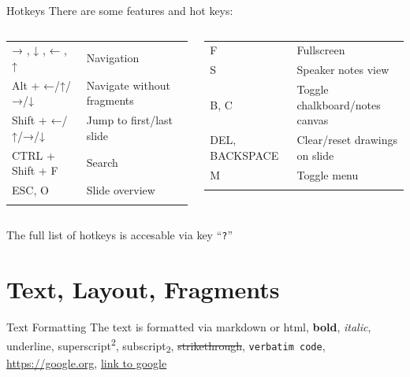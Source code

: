 \documentclass[
  ignorenonframetext,
  aspectratio=169,
]{beamer}
\theoremstyle{plain}
\theoremstyle{remark}
\begin{document}
\begin{frame}[fragile]{Hotkeys}
\label{hotkeys}
There are some features and hot keys:

\begin{columns}[T]
\begin{column}{0.5\textwidth}
\begin{longtable}[]{@{}ll@{}}
\toprule\noalign{}
\endhead
→ , ↓ , ← , ↑ & Navigation \\
Alt + ←/↑/→/↓ & Navigate without fragments \\
Shift + ←/↑/→/↓ & Jump to first/last slide \\
CTRL + Shift + F & Search \\
ESC, O & Slide overview \\
\bottomrule\noalign{}
\end{longtable}
\end{column}

\begin{column}{0.5\textwidth}
\begin{longtable}[]{@{}ll@{}}
\toprule\noalign{}
\endhead
F & Fullscreen \\
S & Speaker notes view \\
B, C & Toggle chalkboard/notes canvas \\
DEL, BACKSPACE & Clear/reset drawings on slide \\
M & Toggle menu \\
\bottomrule\noalign{}
\end{longtable}
\end{column}
\end{columns}

The full list of hotkeys is accesable via key ``\texttt{?}''
\end{frame}

\section{Text, Layout, Fragments}\label{text-layout-fragments}

\begin{frame}[fragile]{Text Formatting}
\label{text-formatting}
The text is formatted via markdown or html, \textbf{bold},
\emph{italic}, underline, superscript\textsuperscript{2},
subscript\textsubscript{2}, \st{strikethrough}, \texttt{verbatim\ code},
\url{https://google.org}, \href{https://google.com}{link to google}

\end{frame}
\end{document}
